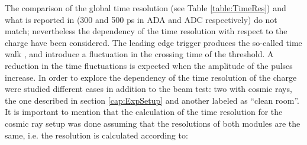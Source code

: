 	\begin{table}[h!]
	   	\centering
	   	\caption{Time resolution after the time slewing correction and time difference of the signal generated in each section with
	   		respect to the center of the AD module. The fibres and PMT sections does not have detection of protons.}
	   	\label{table:OtherRegions_Time}
	\end{table}
	
	The comparison of the global time resolution (see Table \ref{table:TimeRes}) and what is reported in \cite{ADNote} (300 and 500 ps in ADA and ADC respectively) do not match; nevertheless the dependency of the time resolution with respect to the charge have been considered.
	The leading edge trigger produces the so-called time walk \cite{FastTimeMethod}, and introduce a fluctuation in the crossing time of the threshold. 
	A reduction in the time fluctuations is expected when the amplitude of the pulses increase.
	In order to explore the dependency of the time resolution of the charge were studied different cases in addition to the beam test: two with cosmic rays, the one described in section \ref{cap:ExpSetup} and another  labeled as ``clean room''.
	It is important to mention that the calculation of the time resolution for the cosmic ray setup was done assuming that the resolutions of both modules are the same, i.e. the resolution is calculated according to:
	

